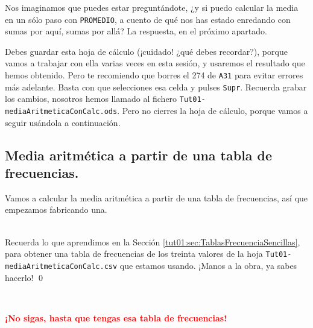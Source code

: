 \documentclass[10pt,a4paper]{article}\usepackage[]{graphicx}\usepackage[]{color}
\newcounter {cont01}
\begin{document}
Nos imaginamos que puedes estar preguntándote, ¿y si puedo calcular la media en un sólo paso con {\tt PROMEDIO}, a cuento de qué nos has estado enredando con sumas por aquí, sumas por allá? La respuesta, en el próximo apartado.

Debes guardar esta hoja de cálculo (¡cuidado! ¿qué debes recordar?), porque vamos a trabajar con ella varias veces en esta sesión, y usaremos el resultado que hemos obtenido. Pero te recomiendo que borres el 274 de {\tt A31} para evitar errores más adelante. Basta con que selecciones esa celda y pulses {\tt Supr}. Recuerda grabar los cambios, nosotros hemos llamado al fichero {\tt Tut01-mediaAritmeticaConCalc.ods}. Pero no cierres la hoja de cálculo, porque vamos a seguir usándola a continuación.


\subsection{Media aritmética a partir de una tabla de frecuencias.}
\label{tut02:sec:mediaAritmeticaConTablaFrecuencias}

Vamos a calcular la media aritmética a partir de una tabla de frecuencias, así que empezamos fabricando una.
\begin{ejercicio}
\quad\\
Recuerda lo que aprendimos en la Sección \ref{tut01:sec:TablasFrecuenciaSencillas}, para obtener una tabla de frecuencias de los treinta valores de la hoja {\tt Tut01-mediaAritmeticaConCalc.csv} que estamos usando. ¡Manos a la obra, ya sabes hacerlo!
\qed
\end{ejercicio}

\quad\\
\begin{center}
  \textcolor{red}{\Large\bf ¡No sigas, hasta que tengas esa tabla de frecuencias!}
\end{center}
\newpage
\end{document}
